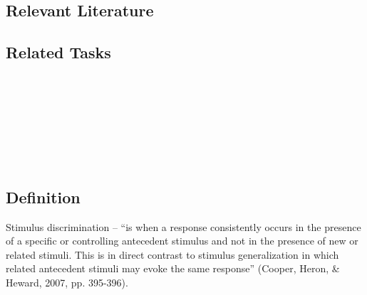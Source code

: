 \subsection{Relevant Literature}
\begin{refsection}
\nocite{test,alang2017police,clayton2018black}
\printbibliography[heading=none]
\end{refsection}
%
\subsection{Related Tasks}
\foureSix{}\\
\fourFKEleven{}\\
\fourFKTwentyFour{}\\
\fourFKThirtyFive{}\\
\fourFKThirtySeven{}\\
\fourjFourteen{}\\
%
%
%
%
%
%
%
%
\section{\fourFKThirtyFive{}}
\subsection{Definition} 
Stimulus discrimination – ``is when a response consistently occurs in the presence of a specific or controlling antecedent stimulus and not in the presence of new or related stimuli.  This is in direct contrast to stimulus generalization in which related antecedent stimuli may evoke the same response'' (Cooper, Heron, \& Heward, 2007, pp. 395-396).    
%
